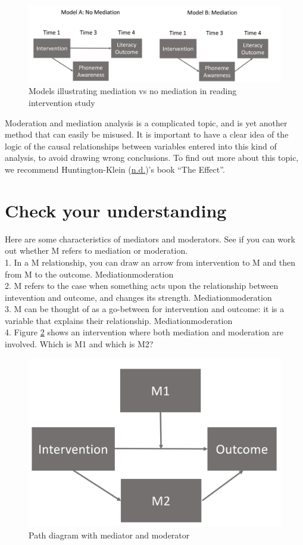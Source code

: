 \documentclass{krantz}
\begin{document}
\begin{center}
\begin{figure}
\includegraphics[width=0.85\linewidth]{images_bw/mediation_diagram} \caption{Models illustrating mediation vs no mediation in reading intervention study}\label{fig:medfig}
\end{figure}
\end{center}

Moderation and mediation analysis is a complicated topic, and is yet another method that can easily be misused. It is important to have a clear idea of the logic of the causal relationships between variables entered into this kind of analysis, to avoid drawing wrong conclusions. To find out more about this topic, we recommend Huntington-Klein (\protect\hyperlink{ref-huntington-klein}{n.d.})'s book ``The Effect''.

\hypertarget{check-your-understanding-15}{%
\section{Check your understanding}\label{check-your-understanding-15}}

Here are some characteristics of mediators and moderators. See if you can work out whether M refers to mediation or moderation.\\
1. In a M relationship, you can draw an arrow from intervention to M and then from M to the outcome. Mediation\textbar moderation\\
2. M refers to the case when something acts upon the relationship between intevention and outcome, and changes its strength. Mediation\textbar moderation\\
3. M can be thought of as a go-between for intervention and outcome: it is a variable that explains their relationship. Mediation\textbar moderation\\
4. Figure \ref{fig:medmodfig} shows an intervention where both mediation and moderation are involved. Which is M1 and which is M2?

\begin{figure}
\includegraphics[width=0.5\linewidth]{images_bw/medmod} \caption{Path diagram with mediator and moderator}\label{fig:medmodfig}
\end{figure}
\end{document}
